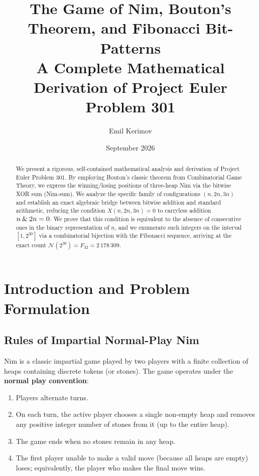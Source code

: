 ﻿\documentclass[a4paper]{article}
\title{\textbf{The Game of Nim, Bouton's Theorem, and Fibonacci Bit-Patterns}\\[6pt]
\large A Complete Mathematical Derivation of Project Euler Problem 301}
\author{Emil Kerimov}
\date{September 2026}
\begin{document}
\maketitle

\begin{abstract}
We present a rigorous, self-contained mathematical analysis and derivation of Project Euler Problem 301. By employing Bouton's classic theorem from Combinatorial Game Theory, we express the winning/losing positions of three-heap Nim via the bitwise XOR sum (Nim-sum). We analyze the specific family of configurations $(n, 2n, 3n)$ and establish an exact algebraic bridge between bitwise addition and standard arithmetic, reducing the condition $X(n, 2n, 3n) = 0$ to carryless addition $n \mathbin{\&} 2n = 0$. We prove that this condition is equivalent to the absence of consecutive ones in the binary representation of $n$, and we enumerate such integers on the interval $[1, 2^{30}]$ via a combinatorial bijection with the Fibonacci sequence, arriving at the exact count $\mathcal{N}(2^{30}) = F_{32} = 2\,178\,309$.
\end{abstract}

\tableofcontents
\vspace{1em}

\section{Introduction and Problem Formulation}

\subsection{Rules of Impartial Normal-Play Nim}
Nim is a classic impartial game played by two players with a finite collection of heaps containing discrete tokens (or stones). The game operates under the \textbf{normal play convention}:
\begin{enumerate}[label=(\roman*)]
    \item Players alternate turns.
    \item On each turn, the active player chooses a single non-empty heap and removes any positive integer number of stones from it (up to the entire heap).
    \item The game ends when no stones remain in any heap.
    \item The first player unable to make a valid move (because all heaps are empty) loses; equivalently, the player who makes the final move wins.
\end{enumerate}
\end{document}
